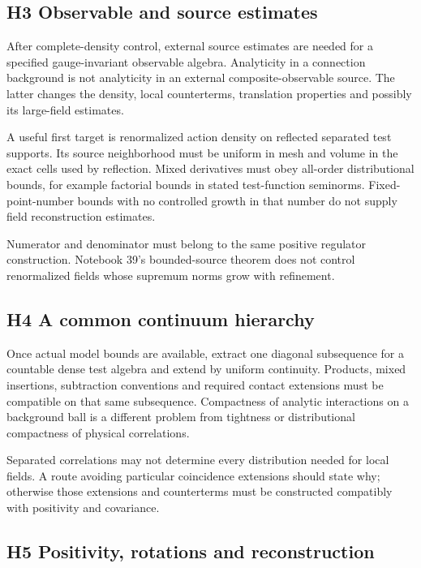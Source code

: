 \subsection{H3 Observable and source estimates}

After complete-density control, external source
estimates are needed for a specified gauge-invariant
observable algebra. Analyticity in a connection
background is not analyticity in an external
composite-observable source. The latter changes the
density, local counterterms, translation properties
and possibly its large-field estimates.

A useful first target is renormalized action density
on reflected separated test supports. Its source
neighborhood must be uniform in mesh and volume
in the exact cells used by reflection. Mixed
derivatives must obey all-order distributional
bounds, for example factorial bounds in stated
test-function seminorms. Fixed-point-number bounds
with no controlled growth in that number do not
supply field reconstruction estimates.

Numerator and denominator must belong to the same
positive regulator construction. Notebook 39's
bounded-source theorem does not control renormalized
fields whose supremum norms grow with refinement.

\subsection{H4 A common continuum hierarchy}

Once actual model bounds are available, extract one
diagonal subsequence for a countable dense test
algebra and extend by uniform continuity. Products,
mixed insertions, subtraction conventions and
required contact extensions must be compatible
on that same subsequence. Compactness of analytic
interactions on a background ball is a different
problem from tightness or distributional
compactness of physical correlations.

Separated correlations may not determine every
distribution needed for local fields. A route
avoiding particular coincidence extensions should
state why; otherwise those extensions and
counterterms must be constructed compatibly with
positivity and covariance.

\subsection{H5 Positivity, rotations and reconstruction}


